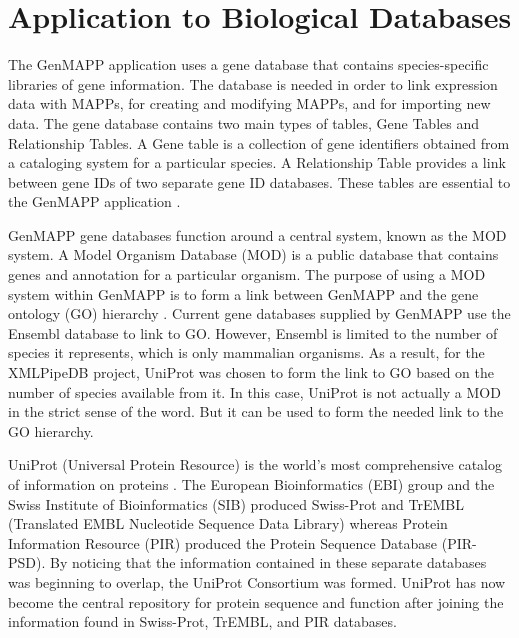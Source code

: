 \section{Application to Biological Databases}
\label{biodb}
The GenMAPP application uses a gene database that contains species-specific 
libraries of gene information.  The database is needed in order to link expression
data with MAPPs, for creating and modifying MAPPs, and for importing new data.  
The gene database contains two main types of tables, Gene Tables and Relationship 
Tables.  A Gene table is a collection of gene identifiers obtained from a 
cataloging system for a particular species.  A Relationship Table provides a link 
between gene IDs of two separate gene ID databases.  These tables are essential to
the GenMAPP application \cite{noSupport}.  

GenMAPP gene databases function around a central system, known as the MOD system.  
A Model Organism Database (MOD) is a public database that contains genes and 
annotation for a particular organism.  
The purpose of using a MOD system within GenMAPP is to form a link between
GenMAPP and the gene ontology (GO) hierarchy \cite{noSupport}.  Current gene 
databases supplied by GenMAPP use the Ensembl database to link to GO.  However, 
Ensembl is limited to the number of species it represents, which is only 
mammalian organisms.  
As a result, for the XMLPipeDB project, UniProt was chosen to form the link to GO
based on the number of species available from it.  In this case, UniProt is not 
actually a MOD in the strict sense of the word.  But it can be used to form the 
needed link to the GO hierarchy.  

UniProt (Universal Protein Resource) is the world's most comprehensive catalog of 
information on proteins \cite{uniprotWeb}.  
The European Bioinformatics (EBI) group and the
Swiss Institute of Bioinformatics (SIB) produced Swiss-Prot and TrEMBL 
(Translated EMBL Nucleotide Sequence Data Library)
whereas 
Protein Information Resource (PIR) produced the Protein Sequence Database (PIR-PSD).  
By noticing that the information contained in these separate databases was beginning
to overlap, the UniProt Consortium was formed.  
UniProt has now become the central repository 
for protein sequence and function after joining the information found in 
Swiss-Prot, TrEMBL, and PIR databases.  

